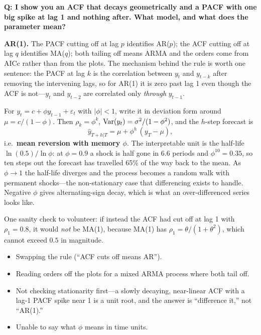 \begin{interviewq}
\textbf{Q: I show you an ACF that decays geometrically and a PACF with one big spike at lag 1 and nothing after. What model, and what does the parameter mean?}

 \quad {} \quad \badgefreq{\freqlow}

\stronganswer

\textbf{AR(1).} The PACF cutting off at lag $p$ identifies AR($p$); the ACF cutting off at lag $q$ identifies MA($q$); both tailing off means ARMA and the orders come from AICc rather than from the plots. The mechanism behind the rule is worth one sentence: the PACF at lag $k$ is the correlation between $y_t$ and $y_{t-k}$ after removing the intervening lags, so for AR(1) it is zero past lag 1 even though the ACF is not---$y_t$ and $y_{t-2}$ are correlated only \emph{through} $y_{t-1}$.

For $y_t = c + \phi y_{t-1} + \varepsilon_t$ with $|\phi| < 1$, write it in deviation form around $\mu = c/(1-\phi)$. Then $\rho_k = \phi^k$, $\operatorname{Var}(y_t) = \sigma^2/(1-\phi^2)$, and the $h$-step forecast is
\[
\hat{y}_{T+h|T} = \mu + \phi^h\,(y_T - \mu),
\]
i.e.\ \textbf{mean reversion with memory $\phi$}. The interpretable unit is the half-life $\ln(0.5)/\ln\phi$: at $\phi = 0.9$ a shock is half gone in $6.6$ periods and $\phi^{10} = 0.35$, so ten steps out the forecast has travelled 65\% of the way back to the mean. As $\phi \to 1$ the half-life diverges and the process becomes a random walk with permanent shocks---the non-stationary case that differencing exists to handle. Negative $\phi$ gives alternating-sign decay, which is what an over-differenced series looks like.

One sanity check to volunteer: if instead the ACF had cut off at lag 1 with $\rho_1 = 0.8$, it would \emph{not} be MA(1), because MA(1) has $\rho_1 = \theta/(1+\theta^2)$, which cannot exceed $0.5$ in magnitude.

\redflags
\begin{itemize}
    \item Swapping the rule (``ACF cuts off means AR'').
    \item Reading orders off the plots for a mixed ARMA process where both tail off.
    \item Not checking stationarity first---a slowly decaying, near-linear ACF with a lag-1 PACF spike near 1 is a unit root, and the answer is ``difference it,'' not ``AR(1).''
    \item Unable to say what $\phi$ means in time units.
\end{itemize}


\end{interviewq}

